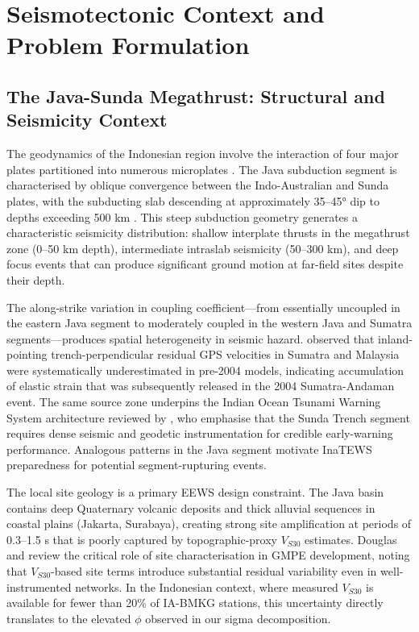 \documentclass[10pt]{article}
\renewcommand{\cite}[1]{\citep{#1}}
\begin{document}
\section{Seismotectonic Context and Problem Formulation}

\subsection{The Java-Sunda Megathrust: Structural and Seismicity Context}

The geodynamics of the Indonesian region involve the interaction of four major plates partitioned into numerous microplates \cite{ref1}. The Java subduction segment is characterised by oblique convergence between the Indo-Australian and Sunda plates, with the subducting slab descending at approximately 35--45° dip to depths exceeding 500 km \cite{ref1}. This steep subduction geometry generates a characteristic seismicity distribution: shallow interplate thrusts in the megathrust zone (0--50 km depth), intermediate intraslab seismicity (50--300 km), and deep focus events that can produce significant ground motion at far-field sites despite their depth.

The along-strike variation in coupling coefficient---from essentially uncoupled in the eastern Java segment to moderately coupled in the western Java and Sumatra segments---produces spatial heterogeneity in seismic hazard. \citet{ref2} observed that inland-pointing trench-perpendicular residual GPS velocities in Sumatra and Malaysia were systematically underestimated in pre-2004 models, indicating accumulation of elastic strain that was subsequently released in the 2004 Sumatra-Andaman event. The same source zone underpins the Indian Ocean Tsunami Warning System architecture reviewed by \citet{jetSrivastava2008}, who emphasise that the Sunda Trench segment requires dense seismic and geodetic instrumentation for credible early-warning performance. Analogous patterns in the Java segment motivate InaTEWS preparedness for potential segment-rupturing events.

The local site geology is a primary EEWS design constraint. The Java basin contains deep Quaternary volcanic deposits and thick alluvial sequences in coastal plains (Jakarta, Surabaya), creating strong site amplification at periods of 0.3--1.5 s that is poorly captured by topographic-proxy \(V_{S30}\) estimates. Douglas and \citet{ref45} review the critical role of site characterisation in GMPE development, noting that \(V_{S30}\)-based site terms introduce substantial residual variability even in well-instrumented networks. In the Indonesian context, where measured \(V_{S30}\) is available for fewer than 20\% of IA-BMKG stations, this uncertainty directly translates to the elevated \(\phi\) observed in our sigma decomposition.
\end{document}
